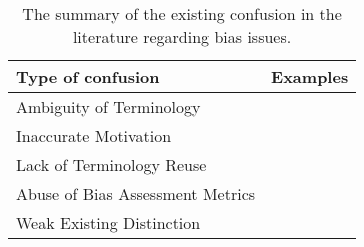 \begin{table}[htbp]
\caption{The summary of the existing confusion in the literature regarding bias issues.}
\label{tab:confusion}
\centering

\begin{tabular}{lc}
\toprule
Type of confusion                 & Examples                                                            \\
\midrule
Ambiguity of Terminology          & \cite{DI,BA,DB_VAE_algorithmic_bias}                                \\
Inaccurate Motivation             & \cite{Back_MI, BlindEye_IMDB_eb,FairCal}                            \\
Lack of Terminology Reuse         & \cite{minority_group_vs_sensitive_attribute,BR_Net_dataset_vs_task,spurious_correlation_Underrepresentation} \\
Abuse of Bias Assessment Metrics & \cite{FURL_PS,Fairalm_DP_difference_false_positive_rate,model_leakage}            \\
Weak Existing Distinction         & \cite{causal_based_fairness,MLbias_survey,datasets_ML}             \\
\bottomrule
\end{tabular}




\end{table}
